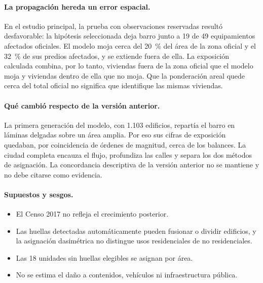 \documentclass[10pt,a4paper]{article}
\begin{document}
\paragraph{La propagación hereda un error espacial.} En el estudio principal, la prueba con observaciones reservadas resultó desfavorable: la hipótesis seleccionada deja barro junto a 19 de 49 equipamientos afectados oficiales. El modelo moja cerca del 20~\% del área de la zona oficial y el 32~\% de sus predios afectados, y se extiende fuera de ella. La exposición calculada combina, por lo tanto, viviendas fuera de la zona oficial que el modelo moja y viviendas dentro de ella que no moja. Que la ponderación areal quede cerca del total oficial no significa que identifique las mismas viviendas.
\paragraph{Qué cambió respecto de la versión anterior.} La primera generación del modelo, con 1.103 edificios, repartía el barro en láminas delgadas sobre un área amplia. Por eso sus cifras de exposición quedaban, por coincidencia de órdenes de magnitud, cerca de los balances. La ciudad completa encauza el flujo, profundiza las calles y separa los dos métodos de asignación. La concordancia descriptiva de la versión anterior no se mantiene y no debe citarse como evidencia.
\paragraph{Supuestos y sesgos.}
\begin{itemize}
\item El Censo 2017 no refleja el crecimiento posterior.
\item Las huellas detectadas automáticamente pueden fusionar o dividir edificios, y la asignación dasimétrica no distingue usos residenciales de no residenciales.
\item Las 18 unidades sin huellas elegibles se asignan por área.
\item No se estima el daño a contenidos, vehículos ni infraestructura pública.
\end{itemize}
\end{document}

